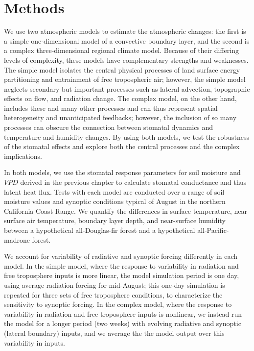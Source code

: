 \section{Methods}

We use two atmospheric models to estimate the atmospheric changes: the first is a simple one-dimensional model of a convective boundary layer, and the second is a complex three-dimensional regional climate model.  Because of their differing levels of complexity, these models have complementary strengths and weaknesses.  The simple model isolates the central physical processes of land surface energy partitioning and entrainment of free tropospheric air; however, the simple model neglects secondary but important processes such as lateral advection, topographic effects on flow, and radiation change.  The complex model, on the other hand, includes these and many other processes and can thus represent spatial heterogeneity and unanticipated feedbacks; however, the inclusion of so many processes can obscure the connection between stomatal dynamics and temperature and humidity changes.  By using both models, we test the robustness of the stomatal effects and explore both the central processes and the complex implications.

In both models, we use the stomatal response parameters for soil moisture and $VPD$ derived in the previous chapter to calculate stomatal conductance and thus latent heat flux.  Tests with each model are conducted over a range of soil moisture values and synoptic conditions typical of August in the northern California Coast Range.  We quantify the differences in surface temperature, near-surface air temperature, boundary layer depth, and near-surface humidity between a hypothetical all-Douglas-fir forest and a hypothetical all-Pacific-madrone forest.

We account for variability of radiative and synoptic forcing differently in each model.  In the simple model, where the response to variability in radiation and free troposphere inputs is more linear, the model simulation period is one day, using average radiation forcing for mid-August; this one-day simulation is repeated for three sets of free troposphere conditions, to characterize the sensitivity to synoptic forcing.  In the complex model, where the response to variability in radiation and free troposphere inputs is nonlinear, we instead run the model for a longer period (two weeks) with evolving radiative and synoptic (lateral boundary) inputs, and we average the the model output over this variability in inputs.

